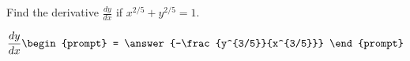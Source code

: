 \documentclass{ximera}
\author{Gregory Hartman \and Matthew Carr}
\begin{document}
\begin{exercise}



Find the derivative $\frac{dy}{dx}$ if $x^{2/5}+y^{2/5}=1$.

\[
\frac{dy}{dx}
\begin{prompt}
= \answer{-\frac{y^{3/5}}{x^{3/5}}}
\end{prompt}
\]

\end{exercise}
\end{document}
